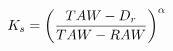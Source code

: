 \documentclass[preview]{standalone}
\begin{document}
\begin{align*}
\special{dvisvgm:raw <g id='unique000'>}K_s = \left(\frac{TAW - D_r}{TAW - RAW}\right)^{\alpha}\special{dvisvgm:raw </g>}
\end{align*}
\end{document}
